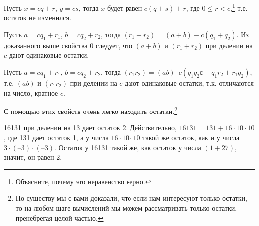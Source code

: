 \begin{dok}
Пусть $x = cq + r$, $y  = cs$, тогда $x$ будет равен $c(q + s) + r$, где $0 \leqslant r < c$,\footnote{Объясните, почему это неравенство верно.} т.е. остаток не изменился.
\end{dok}


\begin{dok}
Пусть $a = cq_1 + r_1$, $b = cq_2 + r_2$, тогда $(r_1 + r_2) = (a + b) - c(q_1 + q_2)$. Из доказанного выше свойства $0$ следует, что $(a + b)$ и $(r_1 + r_2)$ при делении на $c$ дают одинаковые остатки. 
\end{dok}


\begin{dok}
Пусть $a = cq_1 + r_1$, $b = cq_2 + r_2$, тогда $(r_1r_2) = (ab) – c(q_1q_2с + q_1r_2 + r_1q_2)$, т.е. $(ab)$ и $(r_1r_2)$ при делении на $c$ дают одинаковые остатки, т.к. отличаются на число, кратное $c$.
\end{dok}

С помощью этих свойств очень легко находить остатки.\footnote{По существу мы с вами доказали, что если нам интересуют только остатки, то на любом шаге вычислений мы можем рассматривать только остатки, пренебрегая целой частью.}

\begin{samp}
16131 при делении на 13 дает остаток 2. Действительно,   $16131 = 131 + 16\cdot10\cdot10$,    где 131 дает остаток 1,  а у числа $16\cdot10\cdot10$ такой же остаток, как и у числа  $3\cdot(–3)\cdot(–3)$. Остаток у 16131 такой же, как остаток у числа $(1+27)$, значит, он равен 2.
\end{samp}